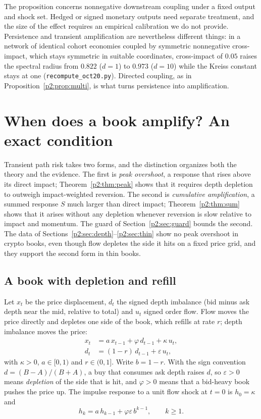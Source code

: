 The proposition concerns nonnegative downstream coupling under a fixed output and shock set. Hedged or signed monetary outputs need separate treatment, and the size of the effect requires an empirical calibration we do not provide. Persistence and transient amplification are nevertheless different things: in a network of identical cohort economies coupled by symmetric nonnegative cross-impact, which stays symmetric in suitable coordinates, cross-impact of $0.05$ raises the spectral radius from $0.822$ ($d=1$) to $0.973$ ($d=10$) while the Kreiss constant stays at one (\texttt{recompute\_oct20.py}). Directed coupling, as in Proposition~\ref{p2:prop:multi}, is what turns persistence into amplification.
\section{When does a book amplify? An exact condition}\label{p2:sec:t6}

Transient path risk takes two forms, and the distinction organizes both the theory and the evidence. The first is \emph{peak overshoot}, a response that rises above its direct impact; Theorem~\ref{p2:thm:peak} shows that it requires depth depletion to outweigh impact-weighted reversion. The second is \emph{cumulative amplification}, a summed response $S$ much larger than direct impact; Theorem~\ref{p2:thm:sum} shows that it arises without any depletion whenever reversion is slow relative to impact and momentum. The guard of Section~\ref{p2:sec:guard} bounds the second. The data of Sections~\ref{p2:sec:depth}--\ref{p2:sec:thin} show no peak overshoot in crypto books, even though flow depletes the side it hits on a fixed price grid, and they support the second form in thin books.

\subsection{A book with depletion and refill}
Let $x_t$ be the price displacement, $d_t$ the signed depth imbalance (bid minus ask depth near the mid, relative to total) and $u_t$ signed order flow. Flow moves the price directly and depletes one side of the book, which refills at rate $r$; depth imbalance moves the price:
\begin{align}
x_t &= a\,x_{t-1} + \varphi\,d_{t-1} + \kappa\,u_t, \label{p2:eq:x}\\
d_t &= (1-r)\,d_{t-1} + \varepsilon\,u_t, \label{p2:eq:d}
\end{align}
with $\kappa>0$, $a\in[0,1)$ and $r\in(0,1]$. Write $b=1-r$. With the sign convention $d=(B-A)/(B+A)$, a buy that consumes ask depth raises $d$, so $\varepsilon>0$ means \emph{depletion} of the side that is hit, and $\varphi>0$ means that a bid-heavy book pushes the price up. The impulse response to a unit flow shock at $t=0$ is $h_0=\kappa$ and
\begin{equation}\label{p2:eq:rec}
h_k=a\,h_{k-1}+\varphi\varepsilon\,b^{k-1},\qquad k\ge1.
\end{equation}

